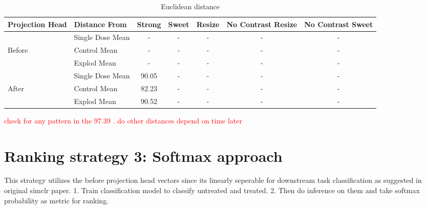 \begin{table}[H]
  \centering
  \begin{tabular}{@{}llccccc@{}}
  \toprule
  Projection Head & Distance From      & Strong & Sweet & Resize & No Contrast Resize & No Contrast Sweet \\ \midrule
                  & Single Dose Mean   & -      & -     & -      & -                  & -                 \\
  Before          & Control Mean       & -      & -     & -      & -                  & -                 \\
                  & Explod Mean        & -      & -     & -      & -                  & -                 \\ \midrule
                  & Single Dose Mean   & 90.05      & -     & -      & -                  & -                 \\
  After           & Control Mean       & 82.23      & -     & -      & -                  & -                 \\
                  & Explod Mean        & 90.52      & -     & -      & -                  & -                 \\ \bottomrule
  \end{tabular}
  \caption{Euclidean distance}
  \label{tab:your_table}
\end{table}


\textcolor{red}{check for any pattern in the 97.39 . do other distances depend on time later }





\section{Ranking strategy 3: Softmax approach}

This strategy utilizes the before projection head vectors since its linearly seperable for downstream task classification as suggested in original simclr paper.
1. Train classification model to classify untreated and treated. 
2. Then do inference on them and take softmax probability as metric for ranking.